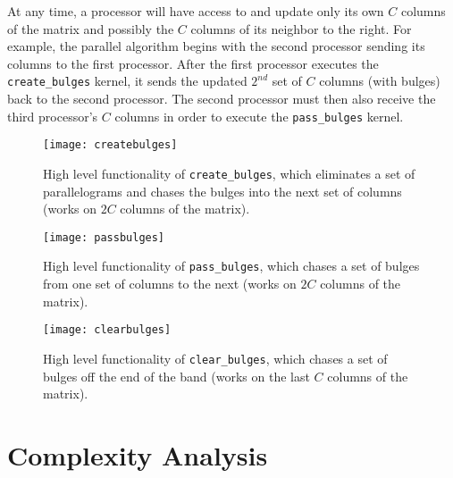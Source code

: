 \documentclass[10pt]{article}
\begin{document}
At any time, a processor will have access to and update only its own $C$ columns of the matrix and possibly the $C$ columns of its neighbor to the right.  For example, the parallel algorithm begins with the second processor sending its columns to the first processor.  After the first processor executes the {\tt create\_bulges} kernel, it sends the updated $2^{nd}$ set of $C$ columns (with bulges) back to the second processor.  The second processor must then also receive the third processor's $C$ columns in order to execute the {\tt pass\_bulges} kernel.

\begin{figure}
	\centering
	\texttt{[image: createbulges]}
	\caption{High level functionality of {\tt create\_bulges}, which eliminates a set of parallelograms and chases the bulges into the next set of columns (works on $2C$ columns of the matrix).}
	\label{fig:createbulges}
\end{figure}

\begin{figure}
	\centering
	\texttt{[image: passbulges]}
	\caption{High level functionality of {\tt pass\_bulges}, which chases a set of bulges from one set of columns to the next (works on $2C$ columns of the matrix).}
	\label{fig:passbulges}
\end{figure}

\begin{figure}
	\centering
	\texttt{[image: clearbulges]}
	\caption{High level functionality of {\tt clear\_bulges}, which chases a set of bulges off the end of the band (works on the last $C$ columns of the matrix).}
	\label{fig:clearbulges}
\end{figure}

\section{Complexity Analysis}

\cite{*}



\end{document}
